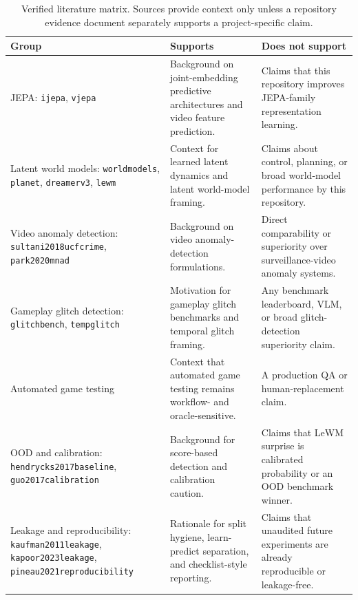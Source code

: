 \begin{table}[t]
\caption{Verified literature matrix. Sources provide context only unless a repository evidence
document separately supports a project-specific claim.}
\label{tab:literature-matrix}
\centering
\small
\begin{tabularx}{\textwidth}{@{}lX X@{}}
\toprule
Group & Supports & Does not support \\
\midrule
JEPA: \texttt{ijepa}, \texttt{vjepa} & Background on joint-embedding predictive architectures and video feature prediction. & Claims that this repository improves JEPA-family representation learning. \\
Latent world models: \texttt{worldmodels}, \texttt{planet}, \texttt{dreamerv3}, \texttt{lewm} & Context for learned latent dynamics and latent world-model framing. & Claims about control, planning, or broad world-model performance by this repository. \\
Video anomaly detection: \texttt{sultani2018ucfcrime}, \texttt{park2020mnad} & Background on video anomaly-detection formulations. & Direct comparability or superiority over surveillance-video anomaly systems. \\
Gameplay glitch detection: \texttt{glitchbench}, \texttt{tempglitch} & Motivation for gameplay glitch benchmarks and temporal glitch framing. & Any benchmark leaderboard, VLM, or broad glitch-detection superiority claim. \\
Automated game testing~\cite{politowski2022automatedtesting} & Context that automated game testing remains workflow- and oracle-sensitive. & A production QA or human-replacement claim. \\
OOD and calibration: \texttt{hendrycks2017baseline}, \texttt{guo2017calibration} & Background for score-based detection and calibration caution. & Claims that LeWM surprise is calibrated probability or an OOD benchmark winner. \\
Leakage and reproducibility: \texttt{kaufman2011leakage}, \texttt{kapoor2023leakage}, \texttt{pineau2021reproducibility} & Rationale for split hygiene, learn-predict separation, and checklist-style reporting. & Claims that unaudited future experiments are already reproducible or leakage-free. \\
\bottomrule
\end{tabularx}
\end{table}
